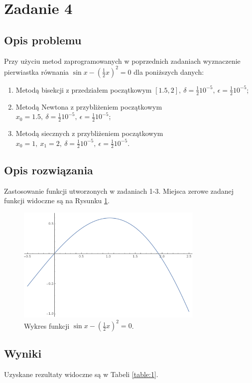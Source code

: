 \documentclass{classrep}
\begin{document}
\section{Zadanie 4}
	\subsection{Opis problemu}
		Przy użyciu metod zaprogramowanych w poprzednich zadaniach wyznaczenie pierwiastka równania $\sin{x}-(\frac{1}{2}x)^2=0$ dla poniższych danych:
		\begin{enumerate}[1.]
			\item Metodą bisekcji z przedziałem początkowym $[1.5,2],~\delta=\frac{1}{2}10^{-5},~\epsilon=\frac{1}{2}10^{-5}$;
			\item Metodą Newtona z przybliżeniem początkowym $x_0=1.5,~\delta=\frac{1}{2}10^{-5},~\epsilon=\frac{1}{2}10^{-5}$;
			\item Metodą siecznych z przybliżeniem początkowym $x_0=1,~x_1=2,~\delta=\frac{1}{2}10^{-5},~\epsilon=\frac{1}{2}10^{-5}$.
		\end{enumerate}
		
	\subsection{Opis rozwiązania}
		Zastosowanie funkcji utworzonych w zadaniach 1-3.
		Miejsca zerowe zadanej funkcji widoczne są na Rysunku \ref{fig:3}.
		
		\begin{figure}[!htbp]
			\centering
			\includegraphics[width=0.8\textwidth]{zadania/plot41.png}
  			\caption{Wykres funkcji $\sin{x}-(\frac{1}{2}x)^2=0$.}
  			\label{fig:3}
		\end{figure}	
		
	
	\subsection{Wyniki}
		Uzyskane rezultaty widoczne są w Tabeli \ref{table:1}.
		
\end{document}
